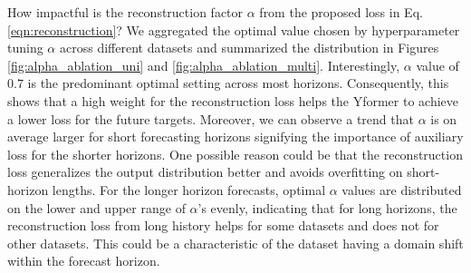 How impactful is the reconstruction factor $\alpha$ from the proposed loss in Eq. \ref{eqn:reconstruction}? We aggregated the optimal value chosen by hyperparameter tuning $\alpha$ across different datasets and summarized the distribution in Figures \ref{fig:alpha_ablation_uni} and \ref{fig:alpha_ablation_multi}. 
Interestingly, $\alpha$ value of $0.7$ is the predominant optimal setting across most horizons. Consequently, this shows that a high weight for the reconstruction loss helps the Yformer to achieve a lower loss for the future targets. Moreover, we can observe a trend that $\alpha$ is on average larger for short forecasting horizons signifying the importance of auxiliary loss for the shorter horizons. One possible reason could be that the reconstruction loss generalizes the output distribution better and avoids overfitting on short-horizon lengths. For the longer horizon forecasts, optimal $\alpha$ values are distributed on the lower and upper range of $\alpha$'s evenly, indicating that for long horizons, the reconstruction loss from long history helps for some datasets and does not for other datasets. This could be a characteristic of the dataset having a domain shift within the forecast horizon.

